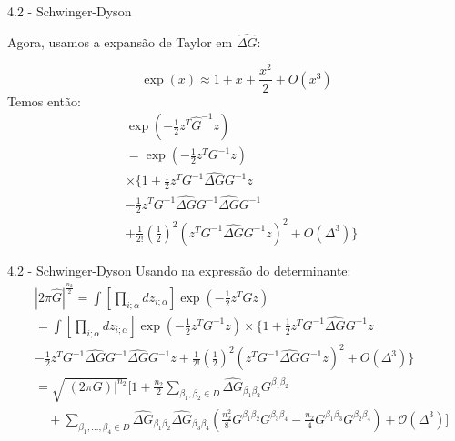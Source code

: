 \documentclass{beamer}
\begin{document}
\begin{frame}{4.2 - Schwinger-Dyson}

    Agora, usamos a expansão de Taylor em $\widehat{\Delta G}$:

    \begin{equation*}
        \exp(x) \approx 1 + x + \frac{x^2}{2} + O(x^3)
    \end{equation*}
    \small
    Temos então:
    \small
    \begin{align*}
        &\exp \left(
            - \frac 1 2 z^T \widehat G^{-1} z 
        \right) \\
        &= \exp \left(
            - \frac 1 2 z^T G^{-1} z 
        \right)\\
        & \times \{
            1 + \frac 1 2 z^T G^{-1} \widehat{\Delta G} G^{-1} z \\
        & -\frac 1 2 z^T G^{-1} \widehat{\Delta G} G^{-1} \widehat{\Delta G} G^{-1} \\
        & +\frac{1}{2!} \left(\frac{1}{2}\right)^2 ( z^T G^{-1} \widehat{\Delta G} G^{-1} z)^2 + O(\Delta^3)
        \} 
    \end{align*}
\end{frame}

\begin{frame}{4.2 - Schwinger-Dyson}
    Usando na expressão do determinante:
    \footnotesize
    \begin{align*}
        &|2\pi\widehat{G}|^{\frac{n_2}{2}} = \int \left[
            \prod_{i;\alpha} d z_{i;\alpha}
        \right]
        \exp(-\frac 1 2 z^T G z) \\
        &= \int \left[
            \prod_{i;\alpha} d z_{i;\alpha}
        \right]
        \exp \left(
            - \frac 1 2 z^T G^{-1} z 
        \right) \times \{
            1 + \frac 1 2 z^T G^{-1} \widehat{\Delta G} G^{-1} z \\
            &-\frac 1 2 z^T G^{-1} \widehat{\Delta G} G^{-1} \widehat{\Delta G} G^{-1} z
            +\frac{1}{2!} \left(\frac{1}{2}\right)^2 ( z^T G^{-1} \widehat{\Delta G} G^{-1} z)^2 + O(\Delta^3)
        \}     \\
        &= \sqrt{ \left| (2\pi G) \right|^{n_2} }
        \bigg[
        1
        + \frac{n_2}{2} \sum_{\beta_1, \beta_2 \in D} \widehat{\Delta G}_{\beta_1 \beta_2} G^{\beta_1 \beta_2} \nonumber \\
        &\quad
        + \sum_{\beta_1, \dots, \beta_4 \in D}
        \widehat{\Delta G}_{\beta_1 \beta_2} \widehat{\Delta G}_{\beta_3 \beta_4}
        \left(
        \frac{n_2^2}{8} G^{\beta_1 \beta_2} G^{\beta_3 \beta_4}
        - \frac{n_2}{4} G^{\beta_1 \beta_3} G^{\beta_2 \beta_4}
        \right)
        + \mathcal{O}(\Delta^3)
        \bigg]
    \end{align*}
\end{frame}
\end{document}

